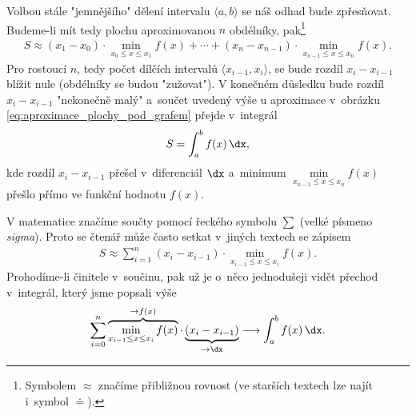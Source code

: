 Volbou stále "jemnějšího" dělení intervalu $\langle a,b \rangle$ se náš odhad bude zpřesňovat. Budeme-li mít tedy plochu aproximovanou $n$ obdélníky, pak\footnote{Symbolem $\approx$ značíme přibližnou rovnost (ve starších textech lze najít i~symbol $\doteq$).}
\begin{align}
\label{eq:aproximace_plochy_pod_grafem}
S \approx (x_1-x_0) \cdot \min\limits_{x_{0} \leq x \leq x_1}{f(x)} +\cdots + (x_n-x_{n-1}) \cdot \min\limits_{x_{n-1} \leq x \leq x_n}{f(x)}.
\end{align}
Pro rostoucí $n$, tedy počet dílčích intervalů $\langle x_{i-1},x_i \rangle$, se bude rozdíl $x_i-x_{i-1}$ blížit nule (obdélníky se budou "zužovat"). V konečném důsledku bude rozdíl $x_i-x_{i-1}$ "nekonečně malý" a~součet uvedený výše u aproximace v~obrázku \ref{eq:aproximace_plochy_pod_grafem} přejde v~integrál
\begin{align*}
S=\int_{a}^{b}{f(x)\,\dx},
\end{align*}
kde rozdíl $x_i-x_{i-1}$ přešel v~diferenciál $\dx$ a~minimum $\min\limits_{x_{n-1} \leq x \leq x_n}{f(x)}$ přešlo přímo ve funkční hodnotu $f(x)$.\par
V matematice značíme součty pomocí řeckého symbolu $\sum$ (velké písmeno \emph{sigma}). Proto se čtenář může často setkat v~jiných textech se zápisem
\begin{align*}
S \approx \sum_{i=1}^{n}{(x_i-x_{i-1}) \cdot \min\limits_{x_{i-1} \leq x \leq x_i}{f(x)}}.
\end{align*}
Prohodíme-li činitele v~součinu, pak už je o~něco jednodušeji vidět přechod v~integrál, který jsme popsali výše
\begin{align*}
\sum_{i=0}^{n}{\overbrace{\min\limits_{x_{i-1} \leq x \leq x_i}{f(x)}}^{\rightarrow f(x)} \cdot \underbrace{(x_i-x_{i-1})}_{\rightarrow \dx}} \longrightarrow \int_{a}^{b}{f(x)\,\dx}.
\end{align*}

